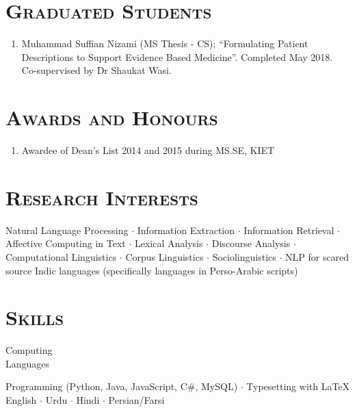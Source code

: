 \documentclass[a4paper, 10pt]{article}
\begin{document}
\section*{\normalfont\textsc{Graduated Students}}
\begin{enumerate}
\itemsep-4pt 
 \item Muhammad Suffian Nizami (MS Thesis - CS); ``Formulating Patient Descriptions to Support Evidence Based Medicine''. Completed May 2018. Co-supervised by Dr Shaukat Wasi.
\end{enumerate}


\section*{\normalfont\textsc{Awards and Honours}}
\begin{enumerate}
\itemsep-4pt 
 \item Awardee of Dean's List 2014 and 2015 during MS.SE, KIET
\end{enumerate}

\section*{\normalfont\textsc{Research Interests}}
Natural Language Processing $\cdot$ Information Extraction $\cdot$ Information Retrieval $\cdot$ Affective Computing in Text $\cdot$ Lexical Analysis $\cdot$ Discourse Analysis $\cdot$ Computational Linguistics $\cdot$  Corpus Linguistics $\cdot$ Sociolinguistics $\cdot$ NLP for scared source Indic languages (specifically languages in Perso-Arabic scripts)

\section*{\normalfont\textsc{Skills}}
\hfill\begin{minipage}{0.17\textwidth}
Computing\textcolor{lightgray}{\dotfill}\\
Languages\textcolor{lightgray}{\dotfill}
\end{minipage}%
\begin{minipage}{0.8\textwidth}
Programming (Python, Java, JavaScript, C\#, MySQL) $\cdot$ Typesetting with \LaTeX\\
English $\cdot$ Urdu $\cdot$ Hindi $\cdot$ Persian/Farsi %
\end{minipage}
\end{document}
